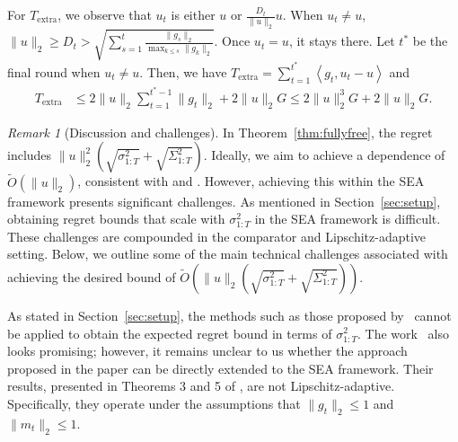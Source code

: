 \documentclass{article}
\theoremstyle{plain}
\theoremstyle{definition}
\theoremstyle{remark}
\newtheorem{remark}[theorem]{Remark}
\newcommand{\inner}[2]{\left\langle #1, #2 \right\rangle}
\renewcommand{\tilde}{\widetilde}
\begin{document}
For  $T_{\text{extra}}$, we observe that $u_t$ is either $u$ or $\frac{D_t}{\| u \|_2} u$. When $u_t \ne u$,  $\| u \|_2 \geq D_t > \sqrt{\sum_{s=1}^t \frac{\| g_s\|_2}{ \max_{k \leq s} \| g_k\|_2}}$. Once $u_t = u$, it stays there. Let $t^*$ be the final round when $u_t \ne u$. Then, we have $T_{\text{extra}} = \sum_{t = 1}^{t^*} \inner{g_t}{u_t - u}$ and 
\begin{align*}
   T_{\text{extra}}%
    &\leq 2 \| u \|_2 \sum_{t = 1}^{t^* - 1} \| g_t \|_2 \!+\! 2 \| u \|_2 G\leq 2 \| u \|_2^3 G \!+\! 2 \| u \|_2 G.
\end{align*}
\fi

\begin{remark}[Discussion and challenges]
In Theorem~\ref{thm:fullyfree}, the regret includes $\|u\|_2^2(\sqrt{\sigma_{1:T}^2}+\sqrt{\Sigma_{1:T}^2})$. Ideally, we aim to achieve a dependence of $\tilde{O}(\|u\|_2)$, consistent with  \cite{cutkosky2019artificial} and \cite{mcmahan2010adaptive}. However, achieving this within the SEA framework presents significant challenges. As mentioned in Section~\ref{sec:setup}, obtaining regret bounds that scale with $\sigma^2_{1:T}$ in the SEA framework is  difficult. These challenges are compounded in the comparator and Lipschitz-adaptive setting. Below, we outline some of the main technical challenges associated with achieving the desired bound of $\tilde{O}(\|u\|_2(\sqrt{\sigma_{1:T}^2}+\sqrt{\Sigma_{1:T}^2}))$.


As stated in Section~\ref{sec:setup}, the methods such as those proposed by~\cite{cutkosky2019artificial,jacobsen2022parameter,jacobsen2023unconstrained} cannot be applied to obtain the expected regret bound in terms of $\sigma^2_{1:T}$. The work~\cite{cutkosky2019combining} also looks promising; however, it remains unclear to us whether the approach proposed in the paper can be directly extended to the SEA framework. Their results, presented in Theorems 3 and 5 of \cite{cutkosky2019combining}, are not Lipschitz-adaptive. Specifically, they operate under the assumptions that $\|g_t\|_2 \leq 1$ and $\|m_t\|_2 \leq 1$. %


\end{remark}
\end{document}
